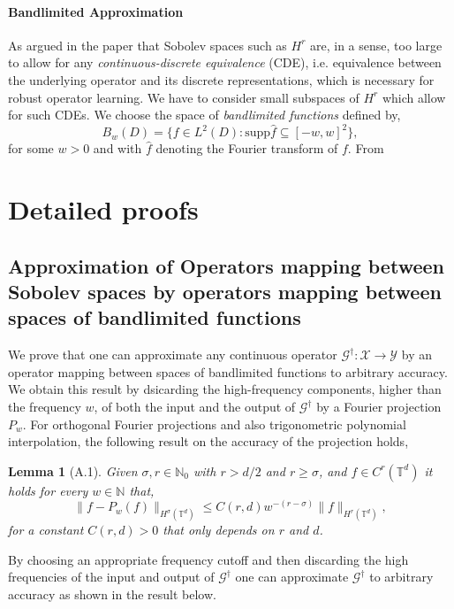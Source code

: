 \documentclass[reqno,9pt]{amsart}
\theoremstyle{plain}
\newtheorem*{lem*}{Lemma}
\theoremstyle{definition}
\newcommand{\bb}[1]{\mathbb{#1}}
\newcommand{\cal}[1]{\mathcal{#1}}
\begin{document}
    \paragraph{\bf Bandlimited Approximation} As argued in the paper \cite{FB2023} that Sobolev spaces such as $H^r$ are, in a sense, too large to allow for any {\it continuous-discrete equivalence} (CDE), i.e. equivalence between the underlying operator and its discrete representations, which is necessary for robust operator learning. We have to consider small subspaces of $H^r$ which allow for such CDEs. We choose the space of {\it bandlimited functions} defined by,
    \begin{equation}
        B_w(D) = \{f \in L^2(D) : \text{supp}\hat{f} \subseteq [-w,w]^2\},
    \end{equation}
    for some $w > 0$ and with $\hat{f}$ denoting the Fourier transform of $f$. From 

    \appendix
    \section{Detailed proofs} \label{appendix:A}
    \subsection[A.1]{Approximation of Operators mapping between Sobolev spaces by operators mapping between spaces of bandlimited functions}
    We prove that one can approximate any continuous operator $\cal G^\dag : \cal X \to \cal Y$ by an operator mapping between spaces of bandlimited functions to arbitrary accuracy. We obtain this result by dsicarding the high-frequency components, higher than the frequency $w$, of both the input and the output of $\cal G^\dag$ by a Fourier projection $P_w$. For orthogonal Fourier projections and also trigonometric polynomial interpolation, the following result on the accuracy of the projection holds,

    \begin{lem*}[A.1] \label{lemA1}
        Given $\sigma, r \in \bb N_0$ with $r > d/2$ and $r \geq \sigma$, and $f \in C^r(\bb T^d)$ it holds for every $w \in \bb N$ that, 
        \begin{equation}
            \|f - P_w(f)\|_{H^\sigma(\bb T^d)} \leq C(r,d)w^{-(r-\sigma)}\|f\|_{H^r(\bb T^d)},
        \end{equation}
        for a constant $C(r,d) > 0$ that only depends on $r$ and $d$.
    \end{lem*}
    By choosing an appropriate frequency cutoff and then discarding the high frequencies of the input and output of $\cal G^\dag$ one can approximate $\cal G^\dag$ to arbitrary accuracy as shown in the result below.
    
\end{document}
